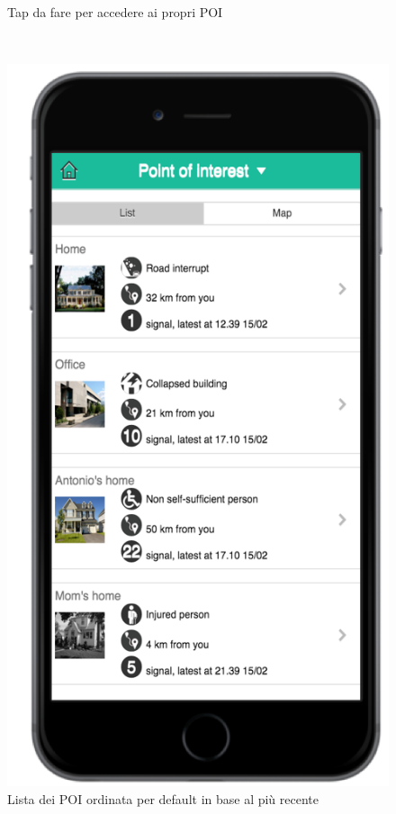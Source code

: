 \begin{figure}
\begin{minipage}[b]{6cm}
	\caption{Tap da fare per accedere ai propri POI }
	\label{fig:buttonpoi}
 \end{minipage}
 \ \hspace{6 mm} \hspace{7 mm} \
 \begin{minipage}[b]{6cm}
\centering
\includegraphics[scale=0.9]{interfaccia/poilist.png}
	\caption{Lista dei POI ordinata per default in base al più recente }
	\label{fig:poilist}
 \end{minipage}
\end{figure}

